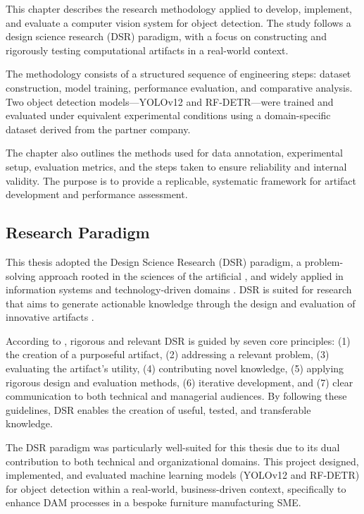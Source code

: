 \documentclass[a4paper,10pt,twocolumn]{article}
\numberwithin{figure}{section}
\numberwithin{table}{section}
\begin{document}
This chapter describes the research methodology applied to develop, 
implement, and evaluate a computer vision system for object detection. 
The study follows a design science research (DSR) paradigm, with a 
focus on constructing and rigorously testing computational 
artifacts in a real-world context.

The methodology consists of a structured sequence of engineering steps: 
dataset construction, model training, performance evaluation, and 
comparative analysis. Two object detection models—YOLOv12 and RF-DETR—were 
trained and evaluated under equivalent experimental conditions using a 
domain-specific dataset derived from the partner company.

The chapter also outlines the methods used for data annotation,
experimental setup, evaluation metrics, and the steps taken to 
ensure reliability and internal validity. The purpose is to provide
a replicable, systematic framework for artifact development and 
performance assessment.

\subsection{Research Paradigm}

This thesis adopted the Design Science Research (DSR) paradigm,
a problem-solving approach rooted in the sciences of the artificial \citep{simon1996sciences}, 
and widely applied in information systems and technology-driven domains \citep{vomBrocke2020introduction}. 
DSR is suited for research that aims to generate actionable 
knowledge through the design and evaluation of innovative artifacts \citep{hevner2004design}.

According to \citet{hevner2004design}, rigorous and relevant DSR is guided by seven core principles: 
(1) the creation of a purposeful artifact, (2) addressing a relevant problem, 
(3) evaluating the artifact’s utility, (4) contributing novel knowledge, 
(5) applying rigorous design and evaluation methods, (6) iterative development, 
and (7) clear communication to both technical and managerial audiences. 
By following these guidelines, DSR enables the creation of useful, tested, and transferable knowledge.

The DSR paradigm was particularly well-suited for this thesis due to its dual contribution 
to both technical and organizational domains. This project designed, implemented, 
and evaluated machine learning models (YOLOv12 and RF-DETR) for object detection 
within a real-world, business-driven context, specifically to enhance 
DAM processes in a bespoke furniture manufacturing SME.
\end{document}
